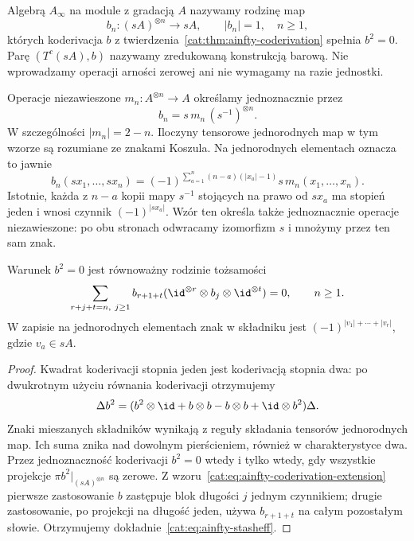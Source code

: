 \begin{definicja}\label{cat:def:ainfty-algebra}
Algebrą $A_\infty$ na module z gradacją $A$ nazywamy rodzinę map
\[
 b_n:(sA)^{\otimes n}\to sA,\qquad |b_n|=1,\quad n\geq1,
\]
których koderivacja $b$ z twierdzenia~\ref{cat:thm:ainfty-coderivation} spełnia $b^2=0$. Parę $(T^c(sA),b)$ nazywamy zredukowaną konstrukcją barową. Nie wprowadzamy operacji arności zerowej ani nie wymagamy na razie jednostki.

Operacje niezawieszone $m_n:A^{\otimes n}\to A$ określamy jednoznacznie przez
\[
 b_n=s\,m_n\,(s^{-1})^{\otimes n}.
\]
W szczególności $|m_n|=2-n$. Iloczyny tensorowe jednorodnych map w tym wzorze są rozumiane ze znakami Koszula. Na jednorodnych elementach oznacza to jawnie
\[
 b_n(sx_1,\ldots,sx_n)
 =(-1)^{\sum_{a=1}^n(n-a)(|x_a|-1)}
 s\,m_n(x_1,\ldots,x_n).
\]
Istotnie, każda z $n-a$ kopii mapy $s^{-1}$ stojących na prawo od $sx_a$ ma stopień jeden i wnosi czynnik $(-1)^{|sx_a|}$. Wzór ten określa także jednoznacznie operacje niezawieszone: po obu stronach odwracamy izomorfizm $s$ i mnożymy przez ten sam znak.
\end{definicja}

\begin{twierdzenie}\label{cat:thm:ainfty-stasheff}
Warunek $b^2=0$ jest równoważny rodzinie tożsamości
\begin{equation}\label{cat:eq:ainfty-stasheff}
 \sum_{r+j+t=n,\ j\geq1}
 b_{r+1+t}(\id^{\otimes r}\otimes b_j\otimes\id^{\otimes t})=0,
 \qquad n\geq1.
\end{equation}
W zapisie na jednorodnych elementach znak w składniku jest
$(-1)^{|v_1|+\cdots+|v_r|}$, gdzie $v_a\in sA$.
\end{twierdzenie}
\begin{proof}
Kwadrat koderivacji stopnia jeden jest koderivacją stopnia dwa: po dwukrotnym użyciu równania koderivacji otrzymujemy
\[
 \Delta b^2=(b^2\otimes\id+b\otimes b-b\otimes b+
 \id\otimes b^2)\Delta.
\]
Znaki mieszanych składników wynikają z reguły składania tensorów jednorodnych map. Ich suma znika nad dowolnym pierścieniem, również w charakterystyce dwa. Przez jednoznaczność koderivacji $b^2=0$ wtedy i tylko wtedy, gdy wszystkie projekcje $\pi b^2|_{(sA)^{\otimes n}}$ są zerowe. Z wzoru~\eqref{cat:eq:ainfty-coderivation-extension} pierwsze zastosowanie $b$ zastępuje blok długości $j$ jednym czynnikiem; drugie zastosowanie, po projekcji na długość jeden, używa $b_{r+1+t}$ na całym pozostałym słowie. Otrzymujemy dokładnie~\eqref{cat:eq:ainfty-stasheff}.
\end{proof}

